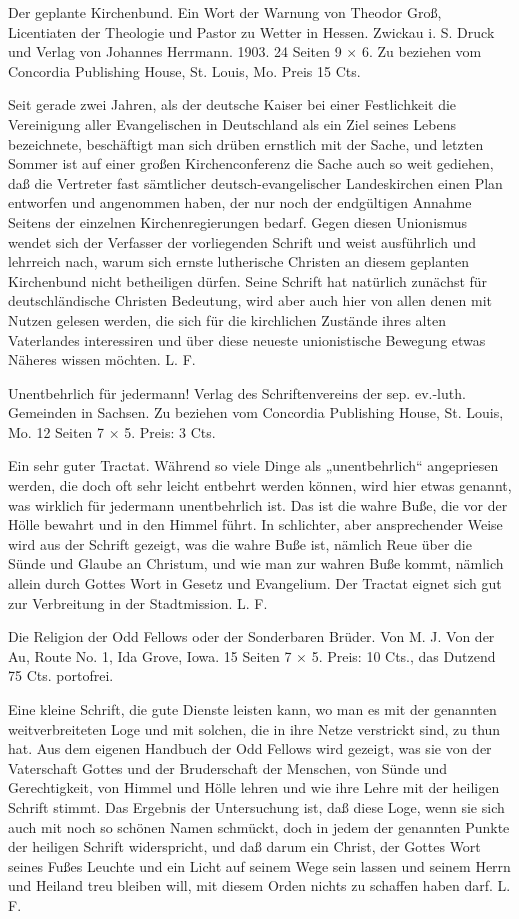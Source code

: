 Der geplante Kirchenbund. Ein Wort der Warnung von Theodor Groß, Licentiaten der Theologie und Pastor zu Wetter in Hessen. Zwickau i. S. Druck und Verlag von Johannes Herrmann. 1903. 24 Seiten 9 × 6. Zu beziehen vom Concordia Publishing House, St. Louis, Mo. Preis 15 Cts.

Seit gerade zwei Jahren, als der deutsche Kaiser bei einer Festlichkeit die Vereinigung aller Evangelischen in Deutschland als ein Ziel seines Lebens bezeichnete, beschäftigt man sich drüben ernstlich mit der Sache, und letzten Sommer ist auf einer großen Kirchenconferenz die Sache auch so weit gediehen, daß die Vertreter fast sämtlicher deutsch-evangelischer Landeskirchen einen Plan entworfen und angenommen haben, der nur noch der endgültigen Annahme Seitens der einzelnen Kirchenregierungen bedarf. Gegen diesen Unionismus wendet sich der Verfasser der vorliegenden Schrift und weist ausführlich und lehrreich nach, warum sich ernste lutherische Christen an diesem geplanten Kirchenbund nicht betheiligen dürfen. Seine Schrift hat natürlich zunächst für deutschländische Christen Bedeutung, wird aber auch hier von allen denen mit Nutzen gelesen werden, die sich für die kirchlichen Zustände ihres alten Vaterlandes interessiren und über diese neueste unionistische Bewegung etwas Näheres wissen möchten. L. F.

Unentbehrlich für jedermann! Verlag des Schriftenvereins der sep. ev.-luth. Gemeinden in Sachsen. Zu beziehen vom Concordia Publishing House, St. Louis, Mo. 12 Seiten 7 × 5. Preis: 3 Cts.

Ein sehr guter Tractat. Während so viele Dinge als „unentbehrlich“ angepriesen werden, die doch oft sehr leicht entbehrt werden können, wird hier etwas genannt, was wirklich für jedermann unentbehrlich ist. Das ist die wahre Buße, die vor der Hölle bewahrt und in den Himmel führt. In schlichter, aber ansprechender Weise wird aus der Schrift gezeigt, was die wahre Buße ist, nämlich Reue über die Sünde und Glaube an Christum, und wie man zur wahren Buße kommt, nämlich allein durch Gottes Wort in Gesetz und Evangelium. Der Tractat eignet sich gut zur Verbreitung in der Stadtmission. L. F.

Die Religion der Odd Fellows oder der Sonderbaren Brüder. Von M. J. Von der Au, Route No. 1, Ida Grove, Iowa. 15 Seiten 7 × 5. Preis: 10 Cts., das Dutzend 75 Cts. portofrei.

Eine kleine Schrift, die gute Dienste leisten kann, wo man es mit der genannten weitverbreiteten Loge und mit solchen, die in ihre Netze verstrickt sind, zu thun hat. Aus dem eigenen Handbuch der Odd Fellows wird gezeigt, was sie von der Vaterschaft Gottes und der Bruderschaft der Menschen, von Sünde und Gerechtigkeit, von Himmel und Hölle lehren und wie ihre Lehre mit der heiligen Schrift stimmt. Das Ergebnis der Untersuchung ist, daß diese Loge, wenn sie sich auch mit noch so schönen Namen schmückt, doch in jedem der genannten Punkte der heiligen Schrift widerspricht, und daß darum ein Christ, der Gottes Wort seines Fußes Leuchte und ein Licht auf seinem Wege sein lassen und seinem Herrn und Heiland treu bleiben will, mit diesem Orden nichts zu schaffen haben darf. L. F.

